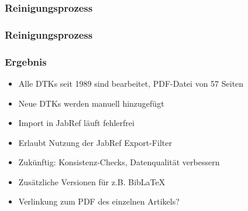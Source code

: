 \documentclass[ngerman]{beamer}
\begin{document}
\begin{frame}[fragile]
\frametitle{Reinigungsprozess}

\begin{center}
\end{center}

\end{frame}


\begin{frame}
\frametitle{Reinigungsprozess}



\end{frame}

\begin{frame}
\frametitle{Ergebnis}

\begin{itemize}
\item Alle DTKs seit 1989 sind bearbeitet, PDF-Datei von 57 Seiten
\item Neue DTKs werden manuell hinzugefügt
\item Import in JabRef läuft fehlerfrei
\item Erlaubt Nutzung der JabRef Export-Filter
\item Zukünftig: Konsistenz-Checks, Datenqualität verbessern
\item Zusätzliche Versionen für z.B. Bib\LaTeX
\item Verlinkung zum PDF des einzelnen Artikels?
\end{itemize}
\end{frame}
\end{document}
